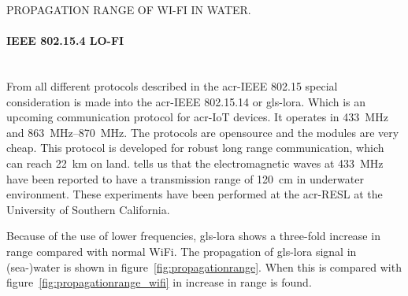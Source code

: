 \begin{RoyalFigure}[!htb, label=fig:propagationrange_wifi]{PROPAGATION RANGE OF WI-FI IN WATER.}
\end{RoyalFigure}

\paragraph{IEEE 802.15.4 LO-FI} \hfill \\
From all different protocols described in the \gls{acr-IEEE} 802.15 special consideration is made into the 
\gls{acr-IEEE} 802.15.14 or \gls{gls-lora}.
Which is an upcoming communication protocol for \gls{acr-IoT} devices. It operates in \SI{433}{\mega\hertz} and 
\SIrange{863}{870}{\mega\hertz}. The protocols are opensource and the modules are very cheap. This protocol is 
developed for robust long range communication, which can reach \SI{22}{\kilo\meter} on land.
\citet{akyildiz_underwater_2005} tells us that the electromagnetic waves at \SI{433}{\mega\hertz} have been reported 
to have a transmission range of \SI{120}{\cm} in underwater environment. These experiments have been performed at the
\gls{acr-RESL} at the University of Southern California.

Because of the use of lower frequencies, \gls{gls-lora} shows a three-fold increase in range compared with normal 
WiFi. The propagation of \gls{gls-lora} signal in (sea-)water is shown in figure~\ref{fig:propagationrange}.
When this is compared with figure~\ref{fig:propagationrange_wifi} in increase in range is found.

